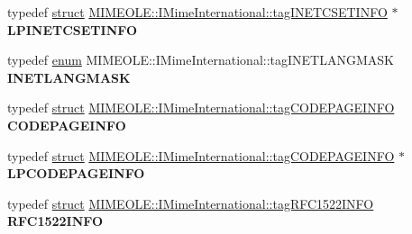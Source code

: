 \begin{DoxyCompactItemize}
\item 
\mbox{\label{interface_m_i_m_e_o_l_e_1_1_i_mime_international_aad220b7ac310e3150ad5c3b933e11b8c}} 
typedef \hyperlink{interfacestruct}{struct} \hyperlink{struct_m_i_m_e_o_l_e_1_1_i_mime_international_1_1tag_i_n_e_t_c_s_e_t_i_n_f_o}{M\+I\+M\+E\+O\+L\+E\+::\+I\+Mime\+International\+::tag\+I\+N\+E\+T\+C\+S\+E\+T\+I\+N\+FO} $\ast$ {\bfseries L\+P\+I\+N\+E\+T\+C\+S\+E\+T\+I\+N\+FO}
\item 
\mbox{\label{interface_m_i_m_e_o_l_e_1_1_i_mime_international_af0a41cc2ab5f324f54f90044ce2d1eae}} 
typedef \hyperlink{interfaceenum}{enum} M\+I\+M\+E\+O\+L\+E\+::\+I\+Mime\+International\+::tag\+I\+N\+E\+T\+L\+A\+N\+G\+M\+A\+SK {\bfseries I\+N\+E\+T\+L\+A\+N\+G\+M\+A\+SK}
\item 
\mbox{\label{interface_m_i_m_e_o_l_e_1_1_i_mime_international_a48344be2a4c3f4ab90f31f4c0bd4f539}} 
typedef \hyperlink{interfacestruct}{struct} \hyperlink{struct_m_i_m_e_o_l_e_1_1_i_mime_international_1_1tag_c_o_d_e_p_a_g_e_i_n_f_o}{M\+I\+M\+E\+O\+L\+E\+::\+I\+Mime\+International\+::tag\+C\+O\+D\+E\+P\+A\+G\+E\+I\+N\+FO} {\bfseries C\+O\+D\+E\+P\+A\+G\+E\+I\+N\+FO}
\item 
\mbox{\label{interface_m_i_m_e_o_l_e_1_1_i_mime_international_a29e01314ddc659cee9a09f2ad463b9bc}} 
typedef \hyperlink{interfacestruct}{struct} \hyperlink{struct_m_i_m_e_o_l_e_1_1_i_mime_international_1_1tag_c_o_d_e_p_a_g_e_i_n_f_o}{M\+I\+M\+E\+O\+L\+E\+::\+I\+Mime\+International\+::tag\+C\+O\+D\+E\+P\+A\+G\+E\+I\+N\+FO} $\ast$ {\bfseries L\+P\+C\+O\+D\+E\+P\+A\+G\+E\+I\+N\+FO}
\item 
\mbox{\label{interface_m_i_m_e_o_l_e_1_1_i_mime_international_a8948b33e007148ab42fc124eeba37d94}} 
typedef \hyperlink{interfacestruct}{struct} \hyperlink{struct_m_i_m_e_o_l_e_1_1_i_mime_international_1_1tag_r_f_c1522_i_n_f_o}{M\+I\+M\+E\+O\+L\+E\+::\+I\+Mime\+International\+::tag\+R\+F\+C1522\+I\+N\+FO} {\bfseries R\+F\+C1522\+I\+N\+FO}
\item 
\mbox{\label{interface_m_i_m_e_o_l_e_1_1_i_mime_international_a6573c89d07e7f09e4e347c43c999642a}} 

\end{DoxyCompactItemize}
